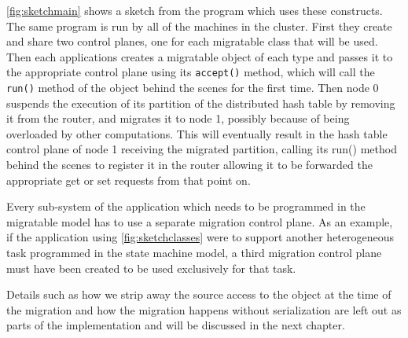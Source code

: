 \autoref{fig:sketchmain} shows
a sketch from the program which uses these constructs. The same program
is run by all of the machines in the cluster. First they create and share
two control planes, one for each migratable class that will be used.
Then each applications creates a migratable object of each type and passes
it to the appropriate control plane using its \texttt{accept()} method,
which will call the \texttt{run()} method of the object behind the scenes
for the first time. Then node 0 suspends the execution of its partition
    of the distributed hash table by removing it from the router,
    and migrates it to node 1, possibly because of being overloaded by
    other computations. This will eventually result in the hash table
    control plane of node 1 receiving the migrated partition, calling its
    run() method behind the scenes to register it in the router allowing
    it to be forwarded the appropriate get or set requests from that
    point on.

Every sub-system of the application which needs to be programmed in the
migratable model has to use a separate migration control plane. As an
example, if the application using \autoref{fig:sketchclasses} were to
support
another heterogeneous task programmed in the state machine model, a third
migration control plane must have been created to be used exclusively for
that task.

Details such as how we strip away the source access to the object at the
time of the migration and how the migration happens without serialization
are left out as parts of the implementation and will be discussed in the
next chapter.



